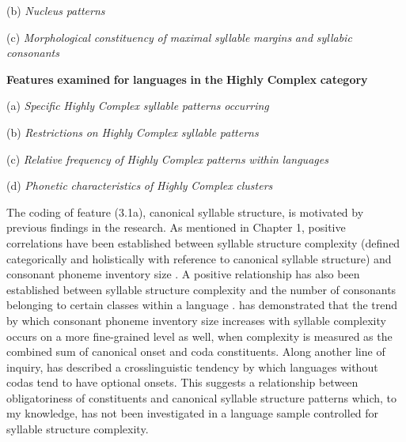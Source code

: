 (b)   \textit{Nucleus} \textit{patterns}

(c)   \textit{Morphological} \textit{constituency} \textit{of} \textit{maximal} \textit{syllable} \textit{margins} \textit{and} \textit{syllabic} \textit{consonants}
\z

\ea\label{ex:(3.2)}
   \textbf{Features} \textbf{examined} \textbf{for} \textbf{languages} \textbf{in} \textbf{the} \textbf{Highly} \textbf{Complex} \textbf{category}

(a)   \textit{Specific} \textit{Highly} \textit{Complex} \textit{syllable} \textit{patterns} \textit{occurring}

(b)   \textit{Restrictions} \textit{on} \textit{Highly} \textit{Complex} \textit{syllable} \textit{patterns}

(c)   \textit{Relative} \textit{frequency} \textit{of} \textit{Highly} \textit{Complex} \textit{patterns} \textit{within} \textit{languages}

(d)   \textit{Phonetic} \textit{characteristics} \textit{of} \textit{Highly} \textit{Complex} \textit{clusters}

\z

  The coding of feature (3.1a), canonical syllable structure, is motivated by previous findings in the research. As mentioned in Chapter 1, positive correlations have been established between syllable structure complexity (defined categorically and holistically with reference to canonical syllable structure) and consonant phoneme inventory size \citep{Maddieson2013a}. A positive relationship has also been established between syllable structure complexity and the number of consonants belonging to certain classes within a language \citep{MaddiesonEtAl2013}. \citet{Gordon2016} has demonstrated that the trend by which consonant phoneme inventory size increases with syllable complexity occurs on a more fine-grained level as well, when complexity is measured as the combined sum of canonical onset and coda constituents. Along another line of inquiry, \citet[336]{Blevins2006} has described a crosslinguistic tendency by which languages without codas tend to have optional onsets. This suggests a relationship between obligatoriness of constituents and canonical syllable structure patterns which, to my knowledge, has not been investigated in a language sample controlled for syllable structure complexity.

